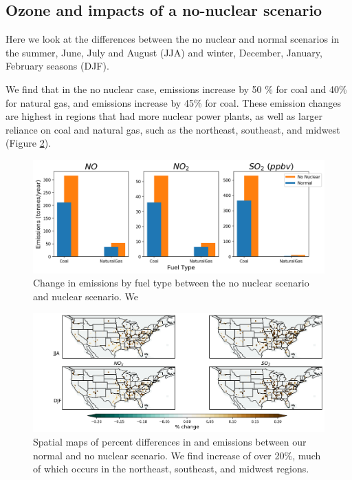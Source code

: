 \documentclass[12]{article}
\begin{document}
\subsection{Ozone and  impacts of a no-nuclear scenario}
Here we look at the differences between the no nuclear and normal scenarios in the summer, June, July and August (JJA) and winter, December, January, February seasons (DJF). 

We find that in the no nuclear case,  emissions increase by 50 \% for coal and 40\% for natural gas, and  emissions increase by 45\% for coal. These emission changes are highest in regions that had more nuclear power plants, as well as larger reliance on coal and natural gas, such as the northeast, southeast, and midwest (Figure \ref{fig:emissions_nonuc}). 

\begin{figure}
    \centering
    \includegraphics[scale=0.4]{ego_nonuclear_project/Figures/emissions_fueltype.png}
    \caption{Change in emissions by fuel type between the no nuclear scenario and nuclear scenario. We } 
    \label{fig:emissions_comp}
\end{figure}

\begin{figure}
    \centering
    \includegraphics[scale=0.4]{ego_nonuclear_project/Figures/nox_so2_emissions.png}
    \caption{Spatial maps of percent differences in  and  emissions between our normal and no nuclear scenario. We find increase of over 20\%, much of which occurs in the northeast, southeast, and midwest regions.} 
    \label{fig:emissions_nonuc}
\end{figure}
\end{document}
